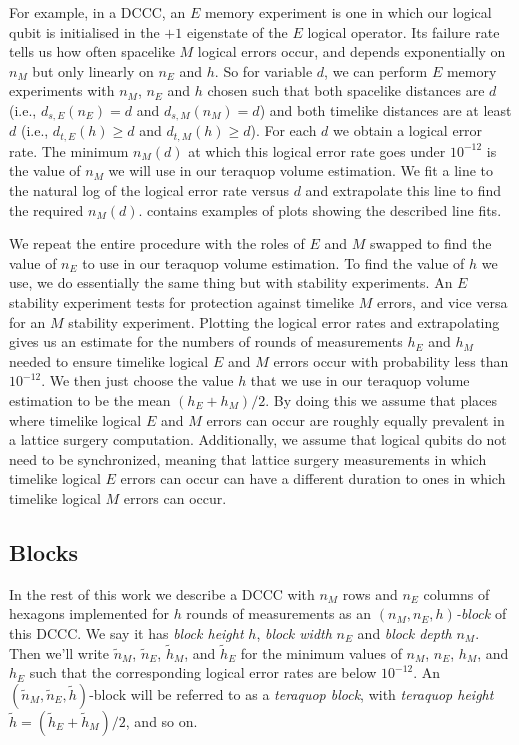For example, in a DCCC, an $E$ memory experiment is one in which our logical qubit is initialised in the $+1$ eigenstate of the $E$ logical operator.
Its failure rate tells us how often spacelike $M$ logical errors occur,
and depends exponentially on $n_M$ but only linearly on $n_E$ and $h$.
So for variable $d$, we can perform $E$ memory experiments with $n_M$, $n_E$ and $h$ chosen such that both spacelike distances are $d$ (i.e., $d_{s,E}(n_E) = d$ and $d_{s,M}(n_M) = d$) and both timelike distances are at least $d$ (i.e., $d_{t,E}(h) \geq d$ and $d_{t,M}(h) \geq d$).
For each $d$ we obtain a logical error rate.
The minimum $n_M(d)$ at which this logical error rate goes under $10^{-12}$ is the value of $n_M$ we will use in our teraquop volume estimation.
We fit a line to the natural log of the logical error rate versus $d$ and extrapolate this line to find the required $n_M(d)$.
 contains examples of plots showing the described line fits.

We repeat the entire procedure with the roles of $E$ and $M$ swapped to find the value of $n_E$ to use in our teraquop volume estimation.
To find the value of $h$ we use, we do essentially the same thing but with stability experiments.
An $E$ stability experiment tests for protection against timelike $M$ errors, and vice versa for an $M$ stability experiment.
Plotting the logical error rates and extrapolating gives us an estimate for the numbers of rounds of measurements $h_E$ and $h_M$ needed to ensure timelike logical $E$ and $M$ errors occur with probability less than $10^{-12}$.
We then just choose the value $h$ that we use in our teraquop volume estimation to be the mean $(h_E + h_M)/2$.
By doing this we assume that places where timelike logical $E$ and $M$ errors can occur are roughly equally prevalent in a lattice surgery computation.
Additionally, we assume that logical qubits do not need to be synchronized, meaning that lattice surgery measurements in which timelike logical $E$ errors can occur can have a different duration to ones in which timelike logical $M$ errors can occur.

\subsection{Blocks}\label{teraquop-blocks}

In the rest of this work we describe a DCCC with $n_M$ rows and $n_E$ columns of hexagons implemented for $h$ rounds of measurements as an \textit{$(n_M, n_E, h)$-block} of this DCCC.
We say it has \textit{block height} $h$, \textit{block width} $n_E$ and \textit{block depth} $n_M$.
Then we'll write $\tilde{n}_M$, $\tilde{n}_E$, $\tilde{h}_M$, and $\tilde{h}_E$ for the minimum values of $n_M$, $n_E$, $h_M$, and $h_E$ such that the corresponding logical error rates are below $10^{-12}$.
An $(\tilde{n}_M, \tilde{n}_E, \tilde{h})$-block will be referred to as a \textit{teraquop block},
with \textit{teraquop height} $\tilde{h} = (\tilde{h}_E + \tilde{h}_M)/2$, and so on.


